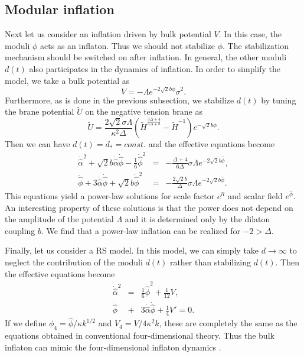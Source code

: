 \documentclass[a4paper,11pt]{article}
\begin{document}
\subsection{Modular inflation}
Next let us consider an inflation driven by bulk potential
$V$. In this case, the moduli $\phi$ acts as an inflaton. 
Thus we should not stabilize $\phi$. The 
stabilization mechanism should be switched on after inflation. 
In general, the other moduli $d(t)$ also participates in the 
dynamics of inflation. In order to simplify the model, we take 
a bulk potential as
\begin{equation}
V=- \Lambda e^{-2 \sqrt{2} b \phi} \sigma^2.
\end{equation}
Furthermore, as is done in the previous subsection, we 
stabilize $d(t)$ by tuning the brane potential $\tilde{U}$
on the negative tension brane as 
\begin{equation}
\tilde{U}= \frac{2 \sqrt{2} \sigma \Lambda}{\kappa^2 \Delta} 
(\tilde{H}^{\frac{3 \Delta+4}{3 \Delta+8}}-\tilde{H}^{-1})
e^{- \sqrt{2} b \hat{\phi}}.
\end{equation}
Then we can have $d(t)=d_{\ast}=const.$ and the effective equations
become
\begin{eqnarray}
\dot{\hat{\alpha}}^2+\sqrt{2} b \dot{\hat{\alpha}}\dot{\hat{\phi}}
-\frac{1}{6}\dot{\hat{\phi}}^2 &=& - \frac{\Delta+4}{6 \Delta} 
 \sigma \Lambda e^{-2 \sqrt{2} b \hat{\phi}}, \\
\ddot{\hat{\phi}}+3\dot{\hat{\alpha}}\dot{\hat{\phi}}
+\sqrt{2}b\dot{\hat{\phi}}^2  &=& 
-\frac{2 \sqrt{2} b}{\Delta} \sigma \Lambda
e^{-2 \sqrt{2} b \hat{\phi}}. 
\end{eqnarray}
This equations yield a power-law solutions for scale factor $e^{\hat{\alpha}}$ 
and scalar field $e^{\hat{\phi}}$.  An interesting property of these
solutions is that the power does not
depend on the amplitude of the potential $\Lambda$ and it is determined 
only by the dilaton coupling $b$. We find that a power-law inflation 
can be realized for $-2 > \Delta $.

Finally, let us consider a RS model. In this model, we can simply take 
$d \to \infty$ to neglect the contribution of the moduli $d(t)$ rather
than stabilizing $d(t)$. Then the effective equations become
\begin{eqnarray}
\dot{\hat{\alpha}}^2 &=& \frac{1}{6} \dot{\hat{\phi}}^2 + \frac{1}{12}V,
\nonumber\\
\ddot{\hat{\phi}} &+& 3 \dot{\hat{\alpha}} \dot{\hat{\phi}}+ \frac{1}{4} V'
=0. 
\end{eqnarray}
If we define $\phi_4= \hat{\phi}/\kappa k^{1/2}$ and $V_4=V/4 \kappa^2 k$,
these are completely the same as the equations obtained in 
conventional four-dimensional theory. Thus the bulk inflaton can mimic 
the four-dimensional inflaton dynamics \cite{HTS}. 
\end{document}
